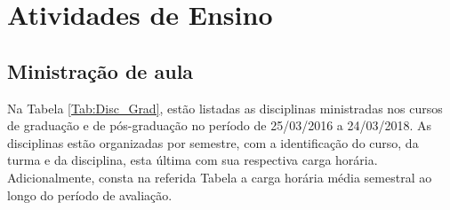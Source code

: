 \documentclass[a4paper,oneside,10pt]{article}
\newcounter{document}%
\begin{document}






\newpage
\section{Atividades de Ensino}

\subsection{Ministração de aula}
\vspace{0.3cm}

Na Tabela \ref{Tab:Disc_Grad}, estão listadas as disciplinas ministradas nos cursos de graduação e de pós-graduação  no período de 25/03/2016 a 24/03/2018. As disciplinas estão organizadas por semestre, com a identificação do curso, da turma e da disciplina, esta última com sua respectiva carga horária. Adicionalmente, consta na referida Tabela a carga horária média semestral ao longo do período de avaliação.
\end{document}
